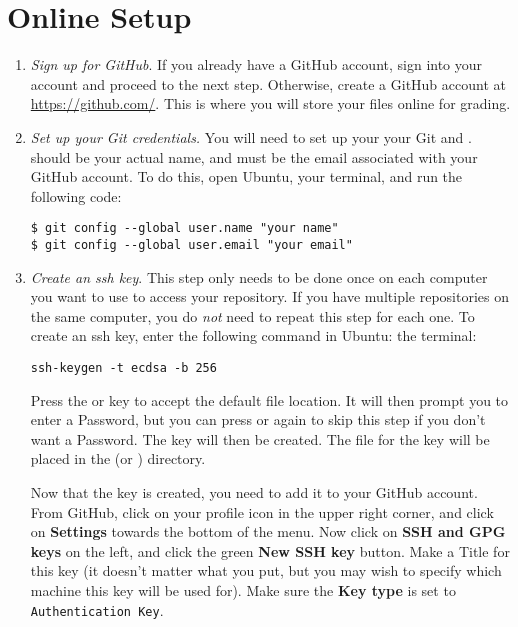 \ifbootcamp
\section*{Online Setup}
\begin{enumerate}
    \item \emph{Sign up for GitHub}.
    \label{step:sign-up}
    If you already have a GitHub account, sign into your account and proceed to the next step.
    Otherwise, create a GitHub account at \url{https://github.com/}.
    This is where you will store your files online for grading.
  

    \item \emph{Set up your Git credentials.}
    You will need to set up your your Git  and .
     should be your actual name, and  must be the email associated with your GitHub account.
    To do this, open 
    \ifwindows
    Ubuntu,
    \else 
    your terminal,
    \fi
    and run the following code:
\begin{lstlisting}
$ git config --global user.name "your name"
$ git config --global user.email "your email"
\end{lstlisting}    

    \item \emph{Create an ssh key}.
    This step only needs to be done once on each computer you want to use to access your repository.
    If you have multiple repositories on the same computer, you do \emph{not} need to repeat this step for each one.
    To create an ssh key, enter the following command in
    \ifwindows
    Ubuntu:
    \else
    the terminal:
    \fi
\begin{lstlisting}
ssh-keygen -t ecdsa -b 256
\end{lstlisting}
    Press the  or  key to accept the default file location.
    It will then prompt you to enter a Password, but you can press  or  again to skip this step if you don't want a Password.
    The key will then be created.
    The file for the key will be placed in the  (or ) directory.
  
    Now that the key is created, you need to add it to your GitHub account.
    From GitHub, click on your profile icon in the upper right corner, and click on \textbf{Settings} towards the bottom of the menu.
    Now click on \textbf{SSH and GPG keys} on the left, and click the green \textbf{New SSH key} button.
    Make a Title for this key (it doesn't matter what you put, but you may wish to specify which machine this key will be used for).
    Make sure the \textbf{Key type} is set to \texttt{Authentication Key}.


\end{enumerate}

